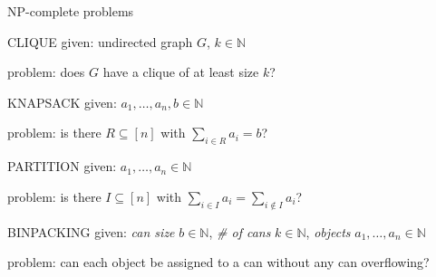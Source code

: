 \documentclass{beamer}
\theoremstyle{definition}
\begin{document}
\begin{frame}[allowframebreaks]{NP-complete problems}
\begin{block}{CLIQUE}
given: undirected graph $G$, $k \in \mathbb{N}$\par
problem: does $G$ have a clique of at least size $k$?
\end{block}

\framebreak

\begin{block}{KNAPSACK}
given: $a_1,\ldots,a_n,b \in \mathbb{N}$\par
problem: is there $R \subseteq [n]$ with $\sum_{i \in R} a_i = b$?
\end{block}

\begin{block}{PARTITION}
given: $a_1,\ldots,a_n \in \mathbb{N}$\par
problem: is there $I \subseteq [n]$ with $\sum_{i \in I} a_i = \sum_{i \not\in I} a_i$?
\end{block}

\begin{block}{BINPACKING}
given: \textit{can size} $b \in \mathbb{N}$, \textit{\# of cans} $k \in \mathbb{N}$, \textit{objects} $a_1,\ldots,a_n \in \mathbb{N}$\par
problem: can each object be assigned to a can without any can overflowing?
\end{block}

\end{frame}



\end{document}
